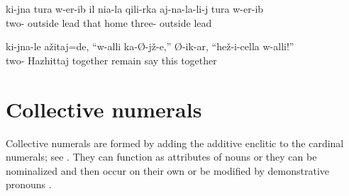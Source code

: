 \begin{exe}
	\ex	\label{ex:atthesecondtime}
	\begin{xlist}
	\TabPositions{10em,12em}
			 \\
			 \\
	\end{xlist}
\end{exe}

\ea\label{ex:twotimeshesendhimaway}
\gll	k{\ej}{\lab}i-jna	t{\lmk}ura	w-er{\paaf}-ib il	ni{\pafr}{\lmk}a-la	qili-rka		{\eppl}a{\pha}j-na-la-li-j	t{\lmk}ura	w-er{\paaf}-ib\\
	two-	outside	lead	that		home		three-	outside	lead\\
\glt	{}
\z

\ea\label{ex:thesecondtimetherewashazhittaj}
\gll	k{\ej}{\lab}i-jna-le	{\phfr}a{\pha}žit{\lmk}aj=de,	``w-alli	ka-{\O}-jž-e,''	{\O}-ik{\ej}{\lab}-ar, ``hež-i-c{\lmk}ella	w-alli!''\\
	two-	Hazhittaj	together	remain	say	this	together\\
\glt	{}
\z





\section{Collective numerals}
\label{sec:collectivenumerals}

Collective numerals are formed by adding the additive enclitic  to the cardinal numerals; see . They can function as attributes of nouns  or they can be nominalized and then occur on their own  or be modified by demonstrative pronouns .

\begin{exe}
	\ex	\label{ex:collectivenumerals}
		\TabPositions{12em}
		  \tab {}  \\
				 \tab {}	 \\
						
\end{exe}

